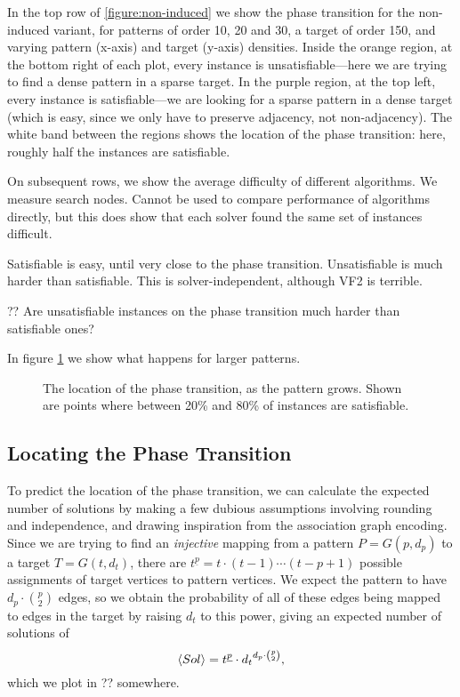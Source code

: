 \documentclass[letterpaper]{article}
\begin{document}
In the top row of \cref{figure:non-induced} we show the phase transition for the non-induced
variant, for patterns of order 10, 20 and 30, a target of order 150, and varying pattern (x-axis)
and target (y-axis) densities. Inside the orange region, at the bottom right of each plot, every
instance is unsatisfiable---here we are trying to find a dense pattern in a sparse target. In the
purple region, at the top left, every instance is satisfiable---we are looking for a sparse pattern
in a dense target (which is easy, since we only have to preserve adjacency, not non-adjacency). The
white band between the regions shows the location of the phase transition: here, roughly half the
instances are satisfiable.

On subsequent rows, we show the average difficulty of different algorithms.  We measure search
nodes. Cannot be used to compare performance of algorithms directly, but this does show that each
solver found the same set of instances difficult.

Satisfiable is easy, until very close to the phase transition. Unsatisfiable is much harder than
satisfiable. This is solver-independent, although VF2 is terrible.

?? Are unsatisfiable instances on the phase transition much harder than satisfiable ones?

In figure \cref{figure:phase-transition-bands} we show what happens for larger patterns.

\begin{figure}[tb]
    
    \caption{The location of the phase transition, as the pattern grows. Shown are points where
    between 20\% and 80\% of instances are satisfiable.}
    \label{figure:phase-transition-bands}
\end{figure}

\subsection{Locating the Phase Transition}

To predict the location of the phase transition, we can calculate the expected number of solutions
by making a few dubious assumptions involving rounding and independence, and drawing inspiration
from the association graph encoding. Since we are trying to find an \emph{injective} mapping from a
pattern $P = G(p, d_p)$ to a target $T = G(t, d_t)$, there are $t^{\underline{p}} = t \cdot (t -
1)\cdots(t - p + 1)$ possible assignments of target vertices to pattern vertices.  We expect the
pattern to have $d_p \cdot \binom{p}{2}$ edges, so we obtain the probability of all of these edges
being mapped to edges in the target by raising $d_t$ to this power, giving an expected number of
solutions of \[ \langle Sol \rangle = t^{\underline{p}} \cdot {d_t}^{d_p \cdot \binom{p}{2}}
\textnormal{,} \] which we plot in ?? somewhere.
\end{document}
